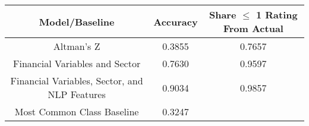 \footnotesize
\begin{tabular}{ccc}
\toprule
Model/Baseline & Accuracy & Share $\le$ 1 Rating From Actual \\
\midrule
Altman's Z & 0.3855 & 0.7657 \\
Financial Variables and Sector & 0.7630 & 0.9597 \\
Financial Variables, Sector, and NLP Features & 0.9034 & 0.9857 \\
Most Common Class Baseline & 0.3247 &  \\
\bottomrule
\end{tabular}

\normalsize